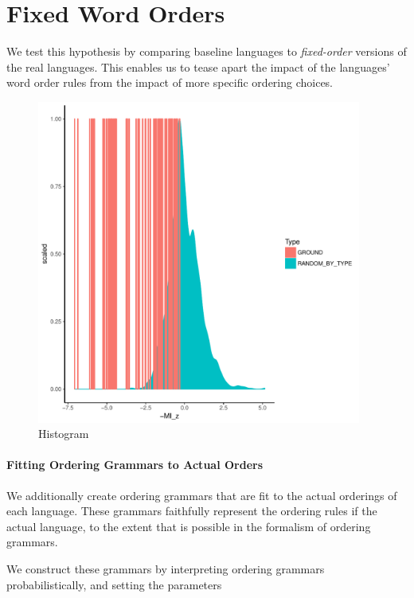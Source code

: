 \documentclass[11pt,letterpaper]{article}
\begin{document}
\section{Fixed Word Orders}

We test this hypothesis by comparing baseline languages to \emph{fixed-order} versions of the real languages.
This enables us to tease apart the impact of the languages' word order rules from the impact of more specific ordering choices.


\begin{figure}
\includegraphics[width=0.95\textwidth]{neural/figures/full-GROUND-listener-surprisal-memory-HIST_z_byMem_onlyWordForms_boundedVocab.pdf}
	\caption{Histogram}\label{fig:hist-real}
\end{figure}



\paragraph{Fitting Ordering Grammars to Actual Orders}
We additionally create ordering grammars that are fit to the actual orderings of each language.
These grammars faithfully represent the ordering rules if the actual language, to the extent that is possible in the formalism of ordering grammars.

We construct these grammars by interpreting ordering grammars probabilistically, and setting the parameters 
\end{document}
